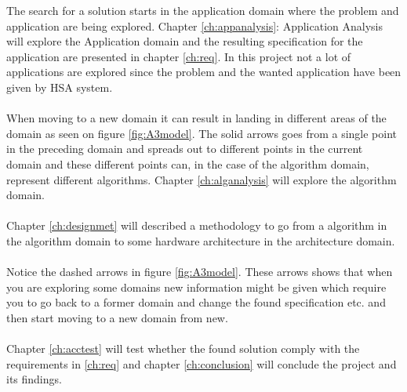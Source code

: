 The search for a solution starts in the application domain where the problem and application are being explored. Chapter \vref{ch:appanalysis}: Application Analysis will explore the Application domain and the resulting specification for the application are presented in chapter \vref{ch:req}. In this project not a lot of applications are explored since the problem and the wanted application have been given by HSA system.\\~\\
When moving to a new domain it can result in landing in different areas of the domain as seen on figure \vref{fig:A3model}. The solid arrows goes from a single point in the preceding domain and spreads out to different points in the current domain and these different points can, in the case of the algorithm domain, represent different algorithms. Chapter \vref{ch:alganalysis} will explore the algorithm domain.\\~\\
Chapter \vref{ch:designmet} will described a methodology to go from a algorithm in the algorithm domain to some hardware architecture in the architecture domain.\\~\\
Notice the dashed arrows in figure \vref{fig:A3model}. These arrows shows that when you are exploring some domains new information might be given which require you to go back to a former domain and change the found specification etc. and then start moving to a new domain from new.\\~\\
Chapter \vref{ch:acctest} will test whether the found solution comply with the requirements in \vref{ch:req} and chapter \vref{ch:conclusion} will conclude the project and its findings. 


